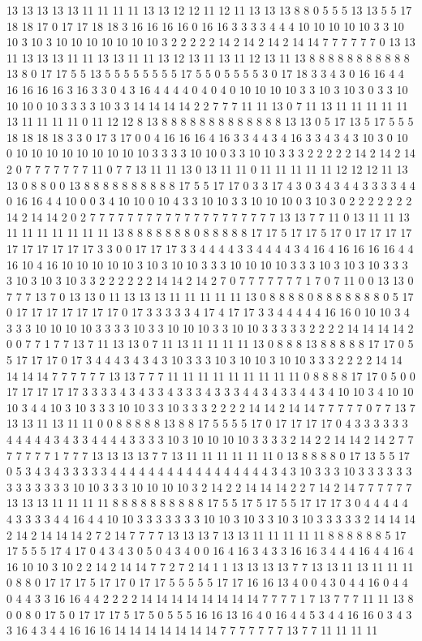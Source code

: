 13 13 13 13 13 11 11 11 11 13 13 12 12 11 12 11 13 13 13 8 8 0 5 5 5 13 13 5 5 17 18 18 17 0 17 17 18 18 3 16 16 16 16 0 16 16 3 3 3 3 4 4 4 10 10 10 10 10 3 3 10 10 3 10 3 10 10 10 10 10 10 10 3 2 2 2 2 2 14 2 14 2 14 2 14 14 7 7 7 7 7 7 0 13 13 11 13 13 13 11 11 13 13 11 11 13 12 13 11 13 11 12 13 11 13 8 8 8 8 8 8 8 8 8 8 8 13 8 0 17 17 5 5 13 5 5 5 5 5 5 5 5 17 5 5 0 5 5 5 5 3 0 17 18 3 3 4 3 0 16 16 4 4 16 16 16 16 3 16 3 3 0 4 3 16 4 4 4 4 0 4 0 4 0 10 10 10 10 3 3 10 3 10 3 0 3 3 10 10 10 0 10 3 3 3 3 10 3 3 14 14 14 14 2 2 7 7 7 11 11 13 0 7 11 13 11 11 11 11 11 13 11 11 11 11 0 11 12 12 8 13 8 8 8 8 8 8 8 8 8 8 8 8 8 13 13 0 5 17 13 5 17 5 5 5 18 18 18 18 3 3 0 17 3 17 0 0 4 16 16 16 4 16 3 3 4 4 3 4 16 3 3 4 3 4 3 10 3 0 10 0 10 10 10 10 10 10 10 10 10 3 3 3 3 10 10 0 3 3 10 10 3 3 3 2 2 2 2 2 14 2 14 2 14 2 0 7 7 7 7 7 7 7 11 0 7 7 13 11 11 13 0 13 11 11 0 11 11 11 11 11 12 12 12 11 13 13 0 8 8 0 0 13 8 8 8 8 8 8 8 8 8 8 17 5 5 17 17 0 3 3 17 4 3 0 3 4 3 4 4 3 3 3 3 4 4 0 16 16 4 4 10 0 0 3 4 10 10 0 10 4 3 3 10 10 3 3 10 10 10 0 3 10 3 0 2 2 2 2 2 2 2 14 2 14 14 2 0 2 7 7 7 7 7 7 7 7 7 7 7 7 7 7 7 7 7 7 7 7 13 13 7 7 11 0 13 11 11 13 11 11 11 11 11 11 11 13 8 8 8 8 8 8 8 0 8 8 8 8 8 17 17 5 17 17 5 17 0 17 17 17 17 17 17 17 17 17 17 3 3 0 0 17 17 17 3 3 4 4 4 4 3 3 4 4 4 4 3 4 16 4 16 16 16 16 4 4 16 10 4 16 10 10 10 10 10 3 10 3 10 10 3 3 3 10 10 10 10 3 3 3 10 3 10 3 10 3 3 3 3 10 3 10 3 10 3 3 2 2 2 2 2 2 14 14 2 14 2 7 0 7 7 7 7 7 7 7 1 7 0 7 11 0 0 13 13 0 7 7 7 13 7 0 13 13 0 11 13 13 13 11 11 11 11 11 13 0 8 8 8 8 0 8 8 8 8 8 8 8 0 5 17 0 17 17 17 17 17 17 17 0 17 3 3 3 3 3 4 17 4 17 17 3 3 4 4 4 4 4 16 16 0 10 10 3 4 3 3 3 10 10 10 10 3 3 3 3 10 3 3 10 10 10 3 3 10 10 3 3 3 3 3 2 2 2 2 14 14 14 14 2 0 0 7 7 1 7 7 13 7 11 13 13 0 7 11 13 11 11 11 11 13 0 8 8 8 13 8 8 8 8 8 17 17 0 5 5 17 17 17 0 17 3 4 4 4 3 4 3 4 3 10 3 3 3 10 3 10 10 3 10 10 3 3 3 2 2 2 2 14 14 14 14 14 7 7 7 7 7 7 13 13 7 7 7 11 11 11 11 11 11 11 11 11 0 8 8 8 8 17 17 0 5 0 0 17 17 17 17 17 3 3 3 3 4 3 4 3 3 4 3 3 3 4 3 3 3 4 4 3 4 3 3 4 4 3 4 10 10 3 4 10 10 10 3 4 4 10 3 10 3 3 3 10 10 3 3 10 3 3 3 2 2 2 2 14 14 2 14 14 7 7 7 7 7 0 7 7 13 7 13 13 11 13 11 11 0 0 8 8 8 8 8 13 8 8 17 5 5 5 5 17 0 17 17 17 17 0 4 3 3 3 3 3 3 4 4 4 4 4 3 4 3 3 4 4 4 4 3 3 3 3 10 3 10 10 10 10 3 3 3 3 2 14 2 2 14 14 2 14 2 7 7 7 7 7 7 7 1 7 7 7 13 13 13 13 7 7 13 11 11 11 11 11 11 0 13 8 8 8 8 0 17 13 5 5 17 0 5 3 4 3 4 3 3 3 3 3 4 4 4 4 4 4 4 4 4 4 4 4 4 4 4 4 4 3 4 3 10 3 3 3 10 3 3 3 3 3 3 3 3 3 3 3 3 3 10 10 3 3 3 10 10 10 10 3 2 14 2 2 14 14 14 2 2 7 14 2 14 7 7 7 7 7 7 13 13 13 11 11 11 11 8 8 8 8 8 8 8 8 8 8 17 5 5 17 5 17 5 5 17 17 17 3 0 4 4 4 4 4 4 3 3 3 3 4 4 16 4 4 10 10 3 3 3 3 3 3 3 10 10 3 10 3 3 10 3 10 3 3 3 3 3 2 14 14 14 2 14 2 14 14 14 2 7 2 14 7 7 7 7 13 13 13 7 13 13 11 11 11 11 11 8 8 8 8 8 8 5 17 17 5 5 5 17 4 17 0 4 3 4 3 0 5 0 4 3 4 0 0 16 4 16 3 4 3 3 16 16 3 4 4 4 16 4 4 16 4 16 10 10 3 10 2 2 14 2 14 14 7 7 2 7 2 14 1 1 13 13 13 13 7 7 13 13 11 13 11 11 11 0 8 8 0 17 17 17 5 17 17 0 17 17 5 5 5 5 5 17 17 16 16 13 4 0 0 4 3 0 4 4 16 0 4 4 0 4 4 3 3 16 16 4 4 2 2 2 2 14 14 14 14 14 14 14 14 7 7 7 7 1 7 13 7 7 7 11 11 13 8 0 0 8 0 17 5 0 17 17 17 5 17 5 0 5 5 5 16 16 13 16 4 0 16 4 4 5 3 4 4 16 16 0 3 4 3 3 16 4 3 4 4 16 16 16 14 14 14 14 14 14 14 7 7 7 7 7 7 7 13 7 7 11 11 11 11 